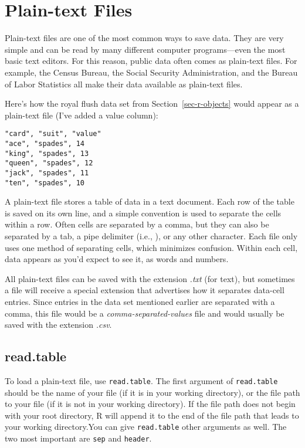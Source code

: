 \documentclass[
  letterpaper,
  DIV=11,
  numbers=noendperiod]{scrbook}
\begin{document}
\section{Plain-text Files}\label{plain-text-files}

Plain-text files are one of the most common ways to save data. They are
very simple and can be read by many different computer programs---even
the most basic text editors. For this reason, public data often comes as
plain-text files. For example, the Census Bureau, the Social Security
Administration, and the Bureau of Labor Statistics all make their data
available as plain-text files.

Here's how the royal flush data set from Section~\ref{sec-r-objects}
would appear as a plain-text file (I've added a value column):

\begin{verbatim}
"card", "suit", "value"
"ace", "spades", 14
"king", "spades", 13
"queen", "spades", 12
"jack", "spades", 11
"ten", "spades", 10
\end{verbatim}

A plain-text file stores a table of data in a text document. Each row of
the table is saved on its own line, and a simple convention is used to
separate the cells within a row. Often cells are separated by a comma,
but they can also be separated by a tab, a pipe delimiter (i.e.,
\texttt{\textbar{}} ), or any other character. Each file only uses one
method of separating cells, which minimizes confusion. Within each cell,
data appears as you'd expect to see it, as words and numbers.

All plain-text files can be saved with the extension \emph{.txt} (for
text), but sometimes a file will receive a special extension that
advertises how it separates data-cell entries. Since entries in the data
set mentioned earlier are separated with a comma, this file would be a
\emph{comma-separated-values} file and would usually be saved with the
extension \emph{.csv}.

\subsection{read.table}\label{read.table}

To load a plain-text file, use \texttt{read.table}. The first argument
of \texttt{read.table} should be the name of your file (if it is in your
working directory), or the file path to your file (if it is not in your
working directory). If the file path does not begin with your root
directory, R will append it to the end of the file path that leads to
your working directory.You can give \texttt{read.table} other arguments
as well. The two most important are \texttt{sep} and \texttt{header}.
\end{document}
